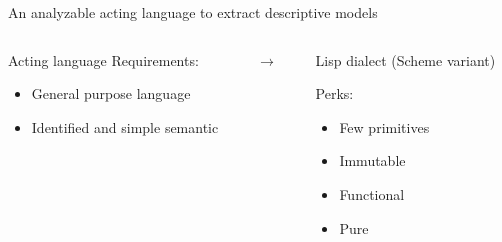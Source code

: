 \begin{frame}[c]{An analyzable acting language to extract descriptive models}
    \begin{columns}[c]
        \begin{column}{0.45\textwidth}
            Acting language Requirements:
            \begin{itemize}
                \item General purpose language
                \item Identified and simple semantic
            \end{itemize}
        \end{column}
        \begin{column}[c]{0.1\textwidth}
            \centering
            $\rightarrow$
        \end{column}
        \begin{column}{0.5\textwidth}
            Lisp dialect (Scheme variant) \cite{moretti1979lambda}

            Perks:
            \begin{itemize}
                \item Few primitives
                \item Immutable
                \item Functional
                \item Pure
            \end{itemize}
        \end{column}
    \end{columns}
\end{frame}


